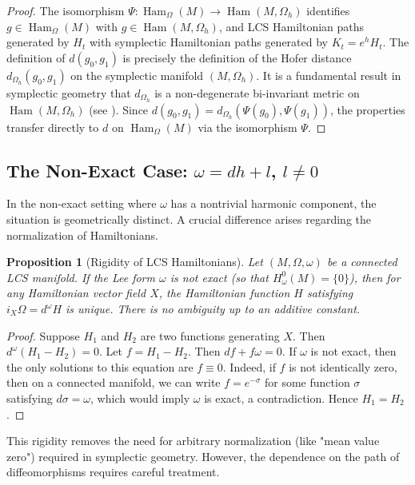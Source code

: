 \documentclass[11pt,a4paper]{amsart}
\newtheorem{proposition}[theorem]{Proposition}
\theoremstyle{definition}
\theoremstyle{remark}
\newcommand{\Ham}{\operatorname{Ham}}
\begin{document}
	\begin{proof}
		The isomorphism $\Psi : \Ham_\Omega(M) \to \Ham(M, \Omega_h)$ identifies $g \in \Ham_\Omega(M)$ with $g \in \Ham(M, \Omega_h)$, and LCS Hamiltonian paths generated by $H_t$ with symplectic Hamiltonian paths generated by $K_t = e^h H_t$. The definition of $d(g_0, g_1)$ is precisely the definition of the Hofer distance $d_{\Omega_h}(g_0, g_1)$ on the symplectic manifold $(M, \Omega_h)$. It is a fundamental result in symplectic geometry that $d_{\Omega_h}$ is a non-degenerate bi-invariant metric on $\Ham(M, \Omega_h)$ (see \cite{McDuffSalamon2017}). Since $d(g_0, g_1) = d_{\Omega_h}(\Psi(g_0), \Psi(g_1))$, the properties transfer directly to $d$ on $\Ham_\Omega(M)$ via the isomorphism $\Psi$.
	\end{proof}
	
	\subsection{The Non-Exact Case: $\omega = dh + l$, $l \neq 0$}
	
	In the non-exact setting where $\omega$ has a nontrivial harmonic component, the situation is geometrically distinct. A crucial difference arises regarding the normalization of Hamiltonians.
	
	\begin{proposition}[Rigidity of LCS Hamiltonians] \label{prop:rigidity}
		Let $(M, \Omega, \omega)$ be a connected LCS manifold. If the Lee form $\omega$ is not exact (so that $H^0_\omega(M) = \{0\}$), then for any Hamiltonian vector field $X$, the Hamiltonian function $H$ satisfying $i_X \Omega = d^\omega H$ is unique. There is no ambiguity up to an additive constant.
	\end{proposition}
	
	\begin{proof}
		Suppose $H_1$ and $H_2$ are two functions generating $X$. Then $d^\omega(H_1 - H_2) = 0$. Let $f = H_1 - H_2$. Then $df + f\omega = 0$. If $\omega$ is not exact, then the only solutions to this equation are $f \equiv 0$. Indeed, if $f$ is not identically zero, then on a connected manifold, we can write $f = e^{-\sigma}$ for some function $\sigma$ satisfying $d\sigma = \omega$, which would imply $\omega$ is exact, a contradiction. Hence $H_1 = H_2$.
	\end{proof}
	
	This rigidity removes the need for arbitrary normalization (like "mean value zero") required in symplectic geometry. However, the dependence on the path of diffeomorphisms requires careful treatment.
	
\end{document}

